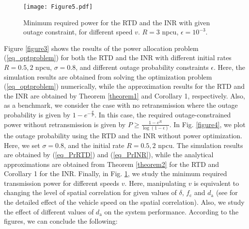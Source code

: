 \begin{figure}
\centering
  \texttt{[image: Figure5.pdf]}\\
\caption{Minimum required power for the RTD and the INR with given outage constraint, for different speed $v$. $R = 3$ npcu, $\epsilon = 10^{-3}$.}\label{figure5}
\end{figure}

Figure \ref{figure3} shows the results of the power allocation problem (\ref{eq_optproblem}) for both the RTD and the INR with different initial rates $R = 0.5, 2$ npcu, $\sigma = 0.8$, and different outage probability constraints $\epsilon$. Here, the simulation results are obtained from  solving the optimization problem (\ref{eq_optproblem}) numerically, while the approximation results for the RTD and the INR are obtained by Theorem \ref{theorem1} and Corollary 1, respectively. Also, as a benchmark, we consider the case with no retransmission where the outage probability is given by $1-e^{-\frac{\theta}{P}}$. In this case, the required outage-constrained power without retransmission is given by $P \geq \frac{1-e^{R}}{\log(1-\epsilon)}$.  In Fig. \ref{figure4}, we plot the outage probability using the  RTD and the INR  without power optimization. Here, we set $\sigma = 0.8$, and the initial rate $R = 0.5, 2$ npcu. The simulation results are obtained by (\ref{eq_PrRTD}) and (\ref{eq_PrINR}), while the analytical approximations are obtained from Theorem \ref{theorem2} for the RTD and Corollary 1 for the INR. Finally, in Fig. \ref{figure5},  we study the minimum required transmission power for different speeds $v$. Here, manipulating $v$ is  equivalent to changing the level of spatial correlation for given values of $\delta$, $f_\text{c}$ and $d_\text{a}$ (see \cite{guo2020semilinear} for the detailed effect of the vehicle speed on the spatial correlation). Also, we study the effect of different values of $d_\text{a}$ on the system performance.   According to the figures, we can conclude the following:


























